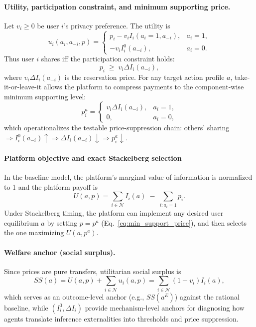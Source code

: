 \documentclass[sigconf,anonymous,review]{acmart}
\theoremstyle{definition}
\begin{document}
\paragraph{Utility, participation constraint, and minimum supporting price.}
Let $v_i\ge 0$ be user $i$'s privacy preference. The utility is
\begin{equation}
u_i(a_i,a_{-i},p)=
\begin{cases}
p_i - v_i I_i(a_i=1,a_{-i}), & a_i=1,\\
- v_i I_i^{0}(a_{-i}), & a_i=0.
\end{cases}
\label{eq:user_utility}
\end{equation}
Thus user $i$ shares iff the participation constraint holds:
\begin{equation}
p_i \;\ge\; v_i\Delta I_i(a_{-i}),
\label{eq:participation_constraint}
\end{equation}
where $v_i\Delta I_i(a_{-i})$ is the reservation price. For any target action profile $a$, take-it-or-leave-it allows the platform to compress payments to the component-wise minimum supporting level:
\begin{equation}
p_i^{a}=
\begin{cases}
v_i\Delta I_i(a_{-i}), & a_i=1,\\
0, & a_i=0,
\end{cases}
\label{eq:min_support_price}
\end{equation}
which operationalizes the testable price-suppression chain:
others' sharing $\Rightarrow I_i^{0}(a_{-i})\uparrow \Rightarrow \Delta I_i(a_{-i})\downarrow \Rightarrow p_i^{a}\downarrow$.
\paragraph{Platform objective and exact Stackelberg selection}
In the baseline model, the platform's marginal value of information is normalized to 1 and the platform payoff is
\begin{equation}
U(a,p)=\sum_{i\in\mathcal{N}} I_i(a)\;-\;\sum_{i:a_i=1} p_i.
\label{eq:platform_obj_app}
\end{equation}
Under Stackelberg timing, the platform can implement any desired user equilibrium $a$ by setting $p=p^a$ (Eq.~\eqref{eq:min_support_price}), and then selects the one maximizing $U(a,p^a)$.
\paragraph{Welfare anchor (social surplus).}
Since prices are pure transfers, utilitarian social surplus is
\begin{equation}
SS(a)=U(a,p)+\sum_{i\in\mathcal{N}}u_i(a,p)
=\sum_{i\in\mathcal{N}}(1-v_i)I_i(a),
\label{eq:social_surplus}
\end{equation}
which serves as an outcome-level anchor (e.g., $SS(a^{E})$) against the rational baseline, while $(I_i^{0},\Delta I_i)$ provide mechanism-level anchors for diagnosing how agents translate inference externalities into thresholds and price suppression.
\end{document}

